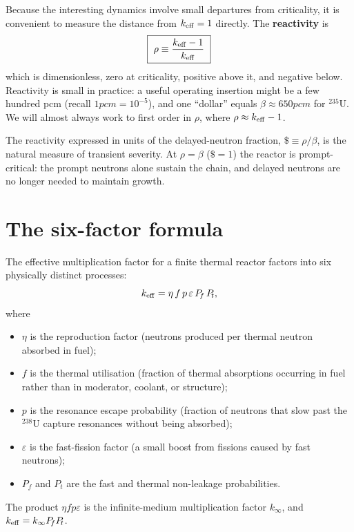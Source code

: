 Because the interesting dynamics involve small departures from criticality, it is
convenient to measure the distance from $k_{\mathrm{eff}}=1$ directly. The
\textbf{reactivity} is
\begin{equation}
\boxed{\ \rho \equiv \frac{\keff-1}{\keff}\ }
\label{eq:reactivity}
\end{equation}
which is dimensionless, zero at criticality, positive above it, and negative
below. Reactivity is small in practice: a useful operating insertion might be a
few hundred pcm (recall $1\unit{pcm}=10^{-5}$), and one ``dollar'' equals
$\beta\approx 650\unit{pcm}$ for $^{235}$U. We will almost always work to first
order in $\rho$, where $\rho\approx k_{\mathrm{eff}}-1$.

\begin{definition}
The reactivity expressed in units of the delayed-neutron fraction,
$\$\equiv \rho/\beta$, is the natural measure of transient severity. At
$\rho=\beta$ ($\$=1$) the reactor is prompt-critical: the prompt neutrons alone
sustain the chain, and delayed neutrons are no longer needed to maintain
growth.
\end{definition}

\section{The six-factor formula}

The effective multiplication factor for a finite thermal reactor factors into six
physically distinct processes:
\begin{equation}
k_{\mathrm{eff}} = \eta\, f\, p\, \varepsilon\, P_{\!f}\, P_{\!t},
\label{eq:sixfactor}
\end{equation}
where
\begin{itemize}[nosep]
\item $\eta$ is the reproduction factor (neutrons produced per thermal neutron
absorbed in fuel);
\item $f$ is the thermal utilisation (fraction of thermal absorptions occurring
in fuel rather than in moderator, coolant, or structure);
\item $p$ is the resonance escape probability (fraction of neutrons that slow
past the $^{238}$U capture resonances without being absorbed);
\item $\varepsilon$ is the fast-fission factor (a small boost from fissions
caused by fast neutrons);
\item $P_{\!f}$ and $P_{\!t}$ are the fast and thermal non-leakage
probabilities.
\end{itemize}
The product $\eta f p \varepsilon$ is the infinite-medium multiplication factor
$k_\infty$, and $k_{\mathrm{eff}} = k_\infty P_{\!f} P_{\!t}$.

